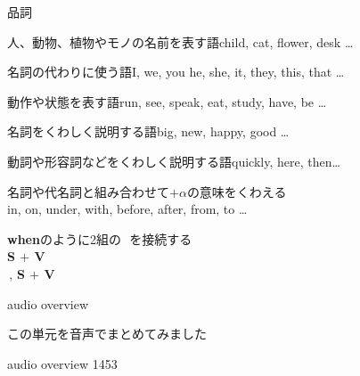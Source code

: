 \documentclass[aspectratio=169,xcolor={dvipsnames,table}]{beamer}
\begin{document}
\begin{frame}[plain,label=basic]{品詞}
 
\begin{description}
 \item[名詞] 人、動物、植物やモノの名前を表す語\hfill{\small child, cat, flower, desk \ldots}
  \item[代名詞] 名詞の代わりに使う語\hfill{\small I, we, you he, she, it, they, this, that \ldots}
 \item[動詞] 動作や状態を表す語\hfill{\small run, see, speak, eat, study, have, be \ldots{}}
 \item[形容詞] 名詞をくわしく説明する語\hfill{\small big, new, happy, good \ldots}
 \item[副詞] 動詞や形容詞などをくわしく説明する語\hfill{\small quickly, here, then\ldots}
 \item[前置詞] 名詞や代名詞と組み合わせて$+\alpha$の意味をくわえる\\
\hfill{\small in, on, under, with, before, after, from, to \ldots}
 \item<2>[接続詞] {\bfseries when}のように2組の\,\,\,\,を接続する\\
\hfill{}{\bfseries S $+$ V}\,\,\,\\
\hfill{}\,,\,\,{\bfseries S $+$ V}
\end{description}

\end{frame}
\begin{frame}[plain]{audio overview}
 
この単元を音声でまとめてみました

\hfill{\tiny audio overview 1453}\,{\scriptsize {}}

\end{frame}
\end{document}
